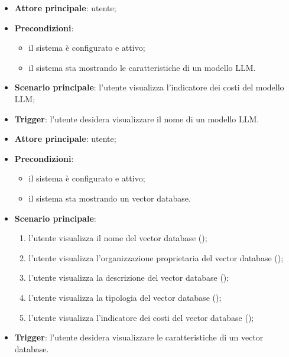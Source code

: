 \documentclass[10pt, a4paper]{article}
\begin{document}
    \begin{itemize}
        \item \textbf{Attore principale}: utente;
        \item \textbf{Precondizioni}:
            \begin{itemize}
                \item il sistema è configurato e attivo;
                \item il sistema sta mostrando le caratteristiche di un modello LLM.
            \end{itemize}
        \item \textbf{Scenario principale}: l'utente visualizza l'indicatore dei costi del modello LLM;
        \item \textbf{Trigger}: l’utente desidera visualizzare il nome di un modello LLM.
    \end{itemize}


    \begin{itemize}
        \item \textbf{Attore principale}: utente;
        \item \textbf{Precondizioni}:
            \begin{itemize}
                \item il sistema è configurato e attivo;
                \item il sistema sta mostrando un vector database.
            \end{itemize}
        \item \textbf{Scenario principale}:
            \begin{enumerate}
                \item l'utente visualizza il nome del vector database ();
                \item l'utente visualizza l'organizzazione proprietaria del vector database ();
                \item l'utente visualizza la descrizione del vector database ();
                \item l'utente visualizza la tipologia del vector database ();
                \item l'utente visualizza l'indicatore dei costi del vector database ();
            \end{enumerate}
        \item \textbf{Trigger}: l’utente desidera visualizzare le caratteristiche di un vector database.
    \end{itemize}
\end{document}
